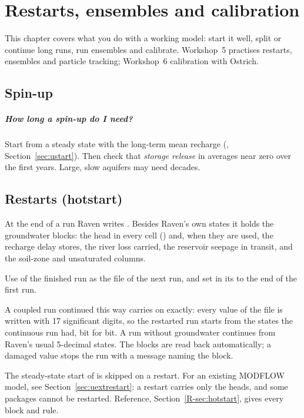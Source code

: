 \chapter{Restarts, ensembles and calibration}\label{uch:restarts}
This chapter covers what you do with a working model: start it well, split or continue long runs, run ensembles and
calibrate. Workshop~5 practises restarts, ensembles and particle tracking; Workshop~6 calibration with Ostrich.

\section{Spin-up}
\paragraph{How long a spin-up do I need?} Start from a steady state with the long-term mean recharge
(, Section~\ref{sec:ustart}). Then check that \emph{storage release} in
 averages near zero over the first years. Large, slow aquifers may need decades.

\section{Restarts (hotstart)}\label{sec:urestart}
At the end of a run Raven writes . Besides Raven's own states it holds the groundwater blocks: the head
in every cell () and, when they are used, the recharge delay stores, the river loss carried, the reservoir
seepage in transit, and the soil-zone and unsaturated columns.
\begin{whattowrite}
Use  of the finished run as the  file of the next run, and set  in its
 to the end of the first run.
\end{whattowrite}
A coupled run continued this way carries on exactly: every value of the file is written with 17 significant digits, so the
restarted run starts from the states the continuous run had, bit for bit. A run without groundwater continues from
Raven's usual 5-decimal states. The blocks are read back automatically; a damaged value stops the run with a message
naming the block.

The steady-state start of  is skipped on a restart. For an existing MODFLOW model, see
Section~\ref{sec:uextrestart}: a restart carries only the heads, and some packages cannot be restarted. Reference,
Section~\ref{R-sec:hotstart}, gives every block and rule.


